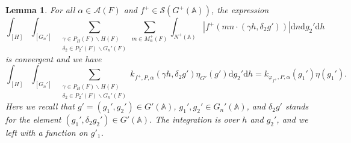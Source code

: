 \documentclass[10pt,a4paper]{amsart}
\newtheorem{lemma}{Lemma}
\newcommand{\bA}{\mathbb{A}}
\newcommand{\cA}{\mathcal{A}}
\newcommand{\cS}{\mathcal{S}}
\newcommand{\rd}{\mathrm{d}}
\begin{document}
\begin{lemma}   \label{lem:geometric_linear_convergence}
For all $\alpha \in \cA(F)$ and $f^+ \in \cS(G^+(\bA))$, the expression
    \[
    \int_{[H]} \int_{[G_n']}
    \sum_{ \substack{ \gamma \in P_H(F) \backslash H(F) \\
    \delta_2 \in P_2'(F) \backslash G_n'(F) }}
    \sum_{m \in M_{\alpha}^+(F)} \int_{N^+(\bA)}
    \left| f^+(mn \cdot (\gamma h, \delta_2 g')) \right| \rd n \rd g_2' \rd h
    \]
is convergent and we have
    \begin{equation}    \label{eq:geo_descent_GL_step_1}
    \int_{[H]} \int_{[G_n']}
    \sum_{ \substack{ \gamma \in P_H(F) \backslash H(F) \\
    \delta_2 \in P_2'(F) \backslash G_n'(F) }}
    k_{f^+, P, \alpha}(\gamma h,\delta_2 g') \eta_{G'}(g') \rd g_2' \rd h =
    k_{\varphi_{f^+}, P, \alpha}(g_1') \eta(g_1').
    \end{equation}
Here we recall that $g' = (g_1', g_2') \in G'(\bA)$, $g_1', g_2' \in G_n'(\bA)$, and $\delta_2 g'$ stands for the element $(g_1', \delta_2 g_2') \in G'(\bA)$. The integration is over $h$ and $g_2'$, and we left with a function on $g'_1$.
\end{lemma}
\end{document}
